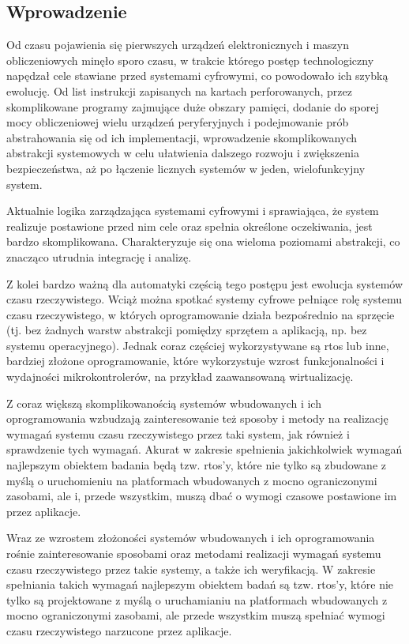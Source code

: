 \documentclass[../../main]{subfiles}
\begin{document}
\subsection{Wprowadzenie}

Od czasu pojawienia się pierwszych urządzeń elektronicznych i maszyn obliczeniowych minęło sporo czasu, w trakcie którego postęp technologiczny napędzał cele stawiane przed systemami cyfrowymi, co powodowało ich szybką ewolucję. Od list instrukcji zapisanych na kartach perforowanych, przez skomplikowane programy zajmujące duże obszary pamięci, dodanie do sporej mocy obliczeniowej wielu urządzeń peryferyjnych i podejmowanie prób abstrahowania się od ich implementacji, wprowadzenie skomplikowanych abstrakcji systemowych w celu ułatwienia dalszego rozwoju i zwiększenia bezpieczeństwa, aż po łączenie licznych systemów w jeden, wielofunkcyjny system.

Aktualnie logika zarządzająca systemami cyfrowymi i sprawiająca, że system realizuje postawione przed nim cele oraz spełnia określone oczekiwania, jest bardzo skomplikowana. Charakteryzuje się ona wieloma poziomami abstrakcji, co znacząco utrudnia integrację i analizę.

Z kolei bardzo ważną dla automatyki częścią tego postępu jest ewolucja systemów czasu rzeczywistego. Wciąż można spotkać systemy cyfrowe pełniące rolę systemu czasu rzeczywistego, w których oprogramowanie działa bezpośrednio na sprzęcie (tj. bez żadnych warstw abstrakcji pomiędzy sprzętem a aplikacją, np. bez systemu operacyjnego). Jednak coraz częściej wykorzystywane są \acrshort{rtos} lub inne, bardziej złożone oprogramowanie, które wykorzystuje wzrost funkcjonalności i wydajności mikrokontrolerów, na przykład zaawansowaną wirtualizację.

Z coraz większą skomplikowanością systemów wbudowanych i ich oprogramowania wzbudzają zainteresowanie też sposoby i metody na realizację wymagań systemu czasu rzeczywistego przez taki system, jak również i sprawdzenie tych wymagań. Akurat w zakresie spełnienia jakichkolwiek wymagań najlepszym obiektem badania będą tzw. \acrshort{rtos}'y, które nie tylko są zbudowane z myślą o uruchomieniu na platformach wbudowanych z mocno ograniczonymi zasobami, ale i, przede wszystkim, muszą dbać o wymogi czasowe postawione im przez aplikacje.

Wraz ze wzrostem złożoności systemów wbudowanych i ich oprogramowania rośnie zainteresowanie sposobami oraz metodami realizacji wymagań systemu czasu rzeczywistego przez takie systemy, a także ich weryfikacją. W zakresie spełniania takich wymagań najlepszym obiektem badań są tzw. \acrshort{rtos}'y, które nie tylko są projektowane z myślą o uruchamianiu na platformach wbudowanych z mocno ograniczonymi zasobami, ale przede wszystkim muszą spełniać wymogi czasu rzeczywistego narzucone przez aplikacje.
\end{document}
